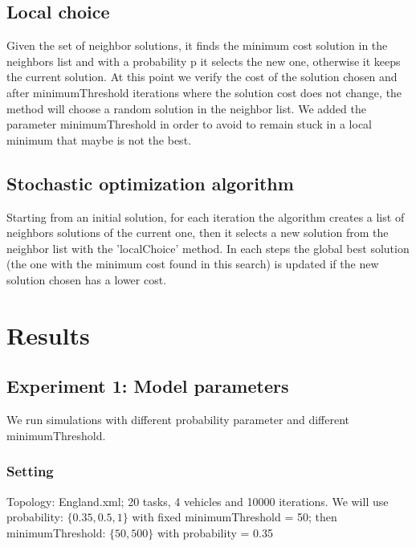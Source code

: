 \documentclass[11pt]{article}
\begin{document}
\subsection{Local choice}
Given the set of neighbor solutions, it finds the minimum cost solution in the neighbors list and with a probability p it selects the new one, otherwise it keeps the current solution. At this point we verify the cost of the solution chosen and after minimumThreshold iterations where the solution cost does not change, the method will choose a random solution in the neighbor list. We added the parameter minimumThreshold in order to avoid to remain stuck in a local minimum that maybe is not the best.

\subsection{Stochastic optimization algorithm}
Starting from an initial solution, for each iteration the algorithm creates a list of neighbors solutions of the current one, then it selects a new solution from the neighbor list with the 'localChoice' method. In each steps the global best solution (the one with the minimum cost found in this search) is updated if the new solution chosen has a lower cost.

\section{Results}

\subsection{Experiment 1: Model parameters}
We run simulations with different probability parameter and different minimumThreshold.

\subsubsection{Setting}
Topology: England.xml; 20 tasks, 4 vehicles and 10000 iterations. We will use probability: $\{0.35, 0.5, 1\}$ with fixed minimumThreshold = 50; then minimumThreshold: $\{50, 500\}$ with probability = 0.35
\end{document}
